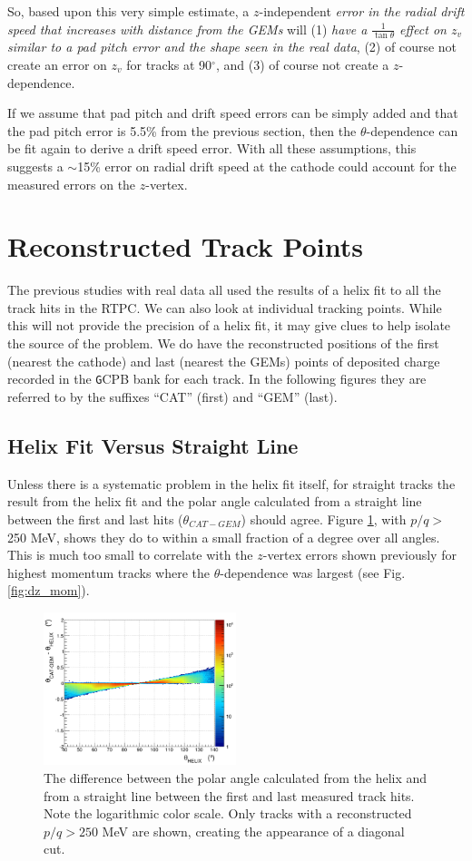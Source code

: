 \documentclass[amsmath,amssymb,notitlepage,11pt]{revtex4-1}
\begin{document}
So, based upon this very simple estimate, a $z$-independent {\it error in the radial drift speed that increases with distance from the GEMs} will (1) {\it have a} $\frac{1}{\tan\theta}$ {\it effect on $z_v$ similar to a pad pitch error and the shape seen in the real data}, (2) of course not create an error on $z_v$ for tracks at 90$^\circ$, and (3) of course not create a $z$-dependence.

If we assume that pad pitch and drift speed errors can be simply added and that the pad pitch error is 5.5\% from the previous section, then the $\theta$-dependence can be fit again to derive a drift speed error.  With all these assumptions, this suggests a $\sim$15\% error on radial drift speed at the cathode could account for the measured errors on the $z$-vertex.

\section{Reconstructed Track Points}
The previous studies with real data all used the results of a helix fit to all the track hits in the RTPC.  We can also look at individual tracking points.  While this will not provide the precision of a helix fit, it may give clues to help isolate the source of the problem.
We do have the reconstructed positions of the first (nearest the cathode) and last (nearest the GEMs) points of deposited charge recorded in the {\texttt GCPB} bank for each track.  In the following figures they are referred to by the suffixes ``CAT'' (first) and ``GEM'' (last).
\subsection{Helix Fit Versus Straight Line}
Unless there is a systematic problem in the helix fit itself, for straight tracks the result from the helix fit and the polar angle calculated from a straight line between the first and last hits ($\theta_{CAT-GEM}$) should agree.  Figure \ref{fig:catgemhel}, with $p/q>$250 MeV, shows they do to within a small fraction of a degree over all angles.  This is much too small to correlate with the $z$-vertex errors shown previously for highest momentum tracks where the $\theta$-dependence was largest (see Fig. \ref{fig:dz_mom}).
\begin{figure}[htbp]\centering
    \includegraphics[width=0.5\textwidth]{pics/dtheta_theta_catgem-helix_poverq_gt_250_small.png}
    \caption{The difference between the polar angle calculated from the helix and from a straight line between the first and last measured track hits.  Note the logarithmic color scale. Only tracks with a reconstructed $p/q>250$ MeV are shown, creating the appearance of a diagonal cut.\label{fig:catgemhel}}
\end{figure}
\end{document}
